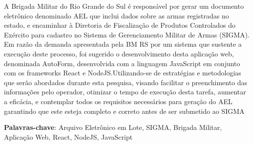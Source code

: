 \setlength{\absparsep}{18pt} %
\begin{resumo}
	A Brigada Militar do Rio Grande do Sul é responsável por gerar um documento eletrônico denominado AEL que inclui dados sobre as armas registradas no estado, e encaminhar à Diretoria de Fiscalização de Produtos Controlados do Exército para cadastro no Sistema de Gerenciamento Militar de Armas (SIGMA). Em razão da demanda apresentada
	pela BM RS por um sistema que sustente a execução deste processo, foi sugerido o desenvolvimento desta aplicação web, denominada AutoForm, desenvolvida com a linguagem JavaScript
	em conjunto com os frameworks React e NodeJS.Utilizando-se de estratégias e metodologias
	que serão abordados durante esta pesquisa, visando facilitar o preenchimento das informações pelo
	operador, otimizar o tempo de execução desta tarefa, aumentar a eficácia, e contemplar todos os
	requisitos necessários para geração do AEL garantindo que este esteja completo e correto antes
	de ser submetido ao SIGMA

	
	\textbf{Palavras-chave}: Arquivo Eletrônico em Lote, SIGMA, Brigada Militar, Aplicação Web, React, NodeJS,  JavaScript  %
\end{resumo}
